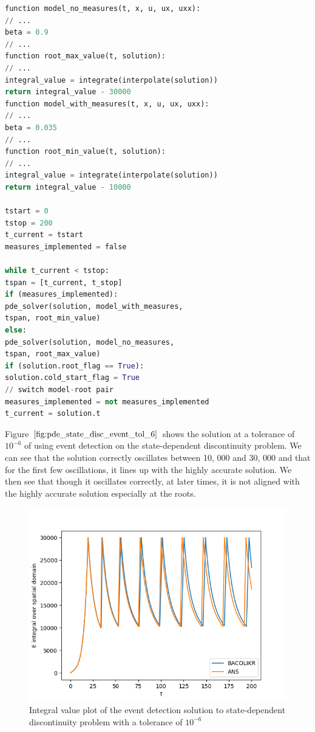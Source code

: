\documentclass{article}
\begin{document}
\begin{minipage}{\linewidth}
\begin{lstlisting}[language=Python]
function model_no_measures(t, x, u, ux, uxx):
// ...
beta = 0.9
// ...
function root_max_value(t, solution):
// ...
integral_value = integrate(interpolate(solution))
return integral_value - 30000
function model_with_measures(t, x, u, ux, uxx):
// ...
beta = 0.035
// ...
function root_min_value(t, solution):
// ...
integral_value = integrate(interpolate(solution))
return integral_value - 10000

tstart = 0
tstop = 200
t_current = tstart
measures_implemented = false

while t_current < tstop:
tspan = [t_current, t_stop]
if (measures_implemented):
pde_solver(solution, model_with_measures, 
tspan, root_min_value)
else:
pde_solver(solution, model_no_measures, 
tspan, root_max_value)
if (solution.root_flag == True):
solution.cold_start_flag = True
// switch model-root pair
measures_implemented = not measures_implemented
t_current = solution.t

\end{lstlisting}
\end{minipage}

Figure $\ref{fig:pde_state_disc_event_tol_6}$ shows the solution at a tolerance of $10^{-6}$ of using event detection on the state-dependent discontinuity problem. We can see that the solution correctly oscillates between 10, 000 and 30, 000 and that for the first few oscillations, it lines up with the highly accurate solution. We then see that though it oscillates correctly, at later times, it is not aligned with the highly accurate solution especially at the roots. 

\begin{figure}[H]
\centering
\includegraphics[width=0.7\linewidth]{./figures/pde_state_disc_event_tol_6}
\caption{Integral value plot of the event detection solution to state-dependent discontinuity problem with a tolerance of $10^{-6}$}
\label{fig:pde_state_disc_event_tol_6}
\end{figure}
\end{document}
